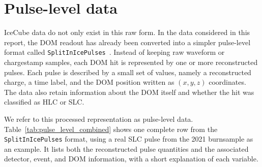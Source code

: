 \section{Pulse-level data}
IceCube data do not only exist in this raw form. In the data considered in this report, the DOM readout has already been converted into a simpler pulse-level format called \texttt{SplitInIcePulses}~\cite{WaveDeformDocs}. Instead of keeping raw waveform or chargestamp samples, each DOM hit is represented by one or more reconstructed pulses. Each pulse is described by a small set of values, namely a reconstructed charge, a time label, and the DOM position written as $(x,y,z)$ coordinates. The data also retain information about the DOM itself and whether the hit was classified as HLC or SLC.

We refer to this processed representation as pulse-level data. Table~\ref{tab:pulse_level_combined} shows one complete row from the \texttt{SplitInIcePulses} format, using a real SLC pulse from the 2021 burnsample as an example. It lists both the reconstructed pulse quantities and the associated detector, event, and DOM information, with a short explanation of each variable.

